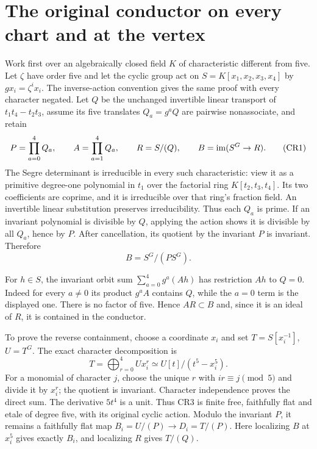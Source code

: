 \documentclass[11pt]{article}
\begin{document}
\section{The original conductor on every chart and at the vertex}
Work first over an algebraically closed field $K$ of characteristic
different from five.  Let $\zeta$ have order five and let the cyclic
group act on $S=K[x_1,x_2,x_3,x_4]$ by $g x_i=\zeta^i x_i$.
The inverse-action convention gives the same proof with every character
negated.  Let $Q$ be the unchanged invertible linear transport of
$t_1t_4-t_2t_3$, assume its five translates $Q_a=g^aQ$ are pairwise
nonassociate, and retain
\[
 P=\prod_{a=0}^4Q_a,\qquad A=\prod_{a=1}^4Q_a,\qquad
 R=S/(Q),\qquad B=\operatorname{im}(S^G\to R).                              \tag{CR1}
\]
The Segre determinant is irreducible in every such characteristic:
view it as a primitive degree-one polynomial in $t_1$ over the
factorial ring $K[t_2,t_3,t_4]$.  Its two coefficients are coprime,
and it is irreducible over that ring's fraction field.  An invertible
linear substitution preserves irreducibility.  Thus each $Q_a$ is
prime.  If an invariant polynomial is divisible by $Q$, applying
the action shows it is divisible by all $Q_a$, hence by $P$.
After cancellation, its quotient by the invariant $P$ is invariant.
Therefore
\[
 B=S^G/(P S^G).                                                \tag{CR2}
\]

For $h\in S$, the invariant orbit sum $\sum_{a=0}^4g^a(Ah)$ has
restriction $Ah$ to $Q=0$.  Indeed for every $a\ne0$ its product
$g^aA$ contains $Q$, while the $a=0$ term is the displayed one.
There is no factor of five.  Hence $AR\subset B$ and, since it
is an ideal of $R$, it is contained in the conductor.

To prove the reverse containment, choose a coordinate $x_i$ and set
$T=S[x_i^{-1}]$, $U=T^G$.  The exact character decomposition is
\[
 T=\bigoplus_{r=0}^4 U x_i^r
   \simeq U[t]/(t^5-x_i^5).                                   \tag{CR3}
\]
For a monomial of character $j$, choose the unique $r$ with
$ir\equiv j\pmod5$ and divide it by $x_i^r$; the quotient is
invariant.  Character independence proves the direct sum.  The
derivative $5t^4$ is a unit.  Thus CR3 is finite free, faithfully
flat and etale of degree five, with its original cyclic action.
Modulo the invariant $P$, it remains a faithfully flat map
$B_i=U/(P)\to D_i=T/(P)$.  Here localizing $B$ at $x_i^5$
gives exactly $B_i$, and localizing $R$ gives $T/(Q)$.
\end{document}
